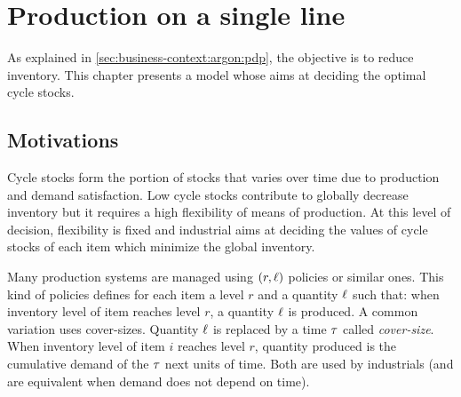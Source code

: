 \chapter{Production on a single line}
\label{chap:lot-size:single-line}






As explained in \cref{sec:business-context:argon:pdp}, the objective is to reduce inventory.
This chapter presents a model whose aims at deciding the optimal cycle stocks.



\section{Motivations}
\label{sec:lot-size:single-line:motivations}

Cycle stocks form the portion of stocks that varies over time due to production and demand satisfaction.
Low cycle stocks contribute to globally decrease inventory but it requires a high flexibility of means of production.
At this level of decision, flexibility is fixed and industrial aims at deciding the values of cycle stocks of each item which minimize the global inventory.


Many production systems are managed using $(r,\ell)$ policies or similar ones.
This kind of policies defines for each item a level $r$ and a quantity $\ell$ such that: when inventory level of item reaches level $r$, a quantity $\ell$ is produced.
A common variation uses cover-sizes.
Quantity $\ell$ is replaced by a time $\tau$ called \emph{cover-size}.
When inventory level of item $i$ reaches level $r$, quantity produced is the cumulative demand of the $\tau$ next units of time.
Both are used by industrials (and are equivalent when demand does not depend on time).


